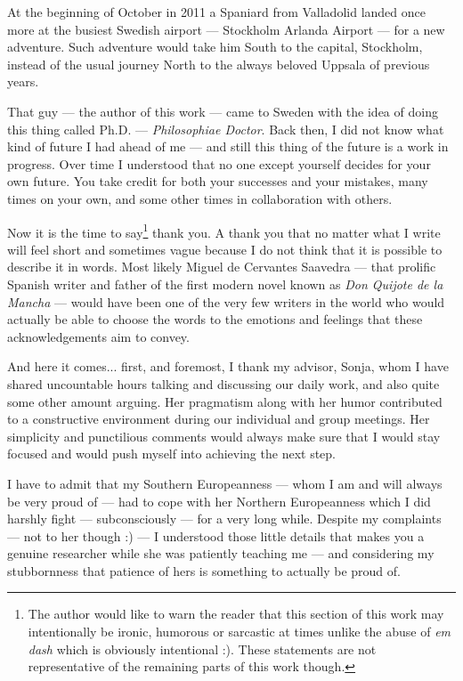 
At the beginning of October in 2011 a Spaniard from Valladolid landed once more 
at the busiest Swedish airport --- Stockholm Arlanda Airport --- for a new adventure. 
Such adventure would take him South to the capital, Stockholm, instead of the usual 
journey North to the always beloved Uppsala of previous years.

That guy --- the author of this work --- came to Sweden with the idea of doing this 
thing called Ph.D. --- \emph{Philosophiae Doctor}. Back then, I did not know what 
kind of future I had ahead of me --- and still this thing of the future is a work 
in progress. Over time I understood that no one except yourself decides for your 
own future. You take credit for both your successes and your mistakes, many times 
on your own, and some other times in collaboration with others.

Now it is the time to say\footnote{The author would like to warn the reader that 
this section of this work may intentionally be ironic, humorous or sarcastic at 
times unlike the abuse of \emph{em dash} which is obviously intentional :). These 
statements are not representative of the remaining parts of this work though.} thank 
you. A thank you that no matter what I write will feel short and sometimes vague 
because I do not think that it is possible to describe it in words. Most likely 
Miguel de Cervantes Saavedra --- that prolific Spanish writer and father of the 
first modern novel known as \emph{Don Quijote de la Mancha} --- would have been 
one of the very few writers in the world who would actually be able to choose the 
words to the emotions and feelings that these acknowledgements aim to convey.

And here it comes... first, and foremost, I thank my advisor, Sonja, whom I have 
shared uncountable hours talking and discussing our daily work, and also quite some 
other amount arguing. Her pragmatism along with her humor contributed to a constructive 
environment during our individual and group meetings. Her simplicity and punctilious 
comments would always make sure that I would stay focused and would push myself 
into achieving the next step.

I have to admit that my Southern Europeanness --- whom I am and will always be very 
proud of --- had to cope with her Northern Europeanness which I did harshly fight --- 
subconsciously --- for a very long while. Despite my complaints --- not to her though 
:) --- I understood those little details that makes you a genuine researcher while 
she was patiently teaching me --- and considering my stubbornness that patience of hers 
is something to actually be proud of.

